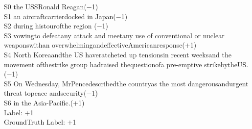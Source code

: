 \documentclass{article}
\begin{document}
\begin{tcolorbox}[colback=yellow!5!white,colframe=yellow!50!black,colbacktitle=yellow!75!black,title=Document 1,fonttitle=\bfseries]
\colorbox{green!14.285714285714285}{S0} \colorbox{red!75.0}{the} USS\colorbox{red!100.0}{Ronald} Reagan(\textsf{$-$1})\\
\colorbox{green!28.57142857142857}{S1} \colorbox{red!66.66666666666666}{an} aircraftcarrier\colorbox{red!83.33333333333334}{docked} \colorbox{red!100.0}{in} Japan(\textsf{$-$1})\\
\colorbox{green!42.857142857142854}{S2} \colorbox{red!66.66666666666666}{during} histourof\colorbox{red!83.33333333333334}{the} \colorbox{red!100.0}{region} (\textsf{$-$1})\\
\colorbox{green!57.14285714285714}{S3} vowing\colorbox{red!61.904761904761905}{to} defeat\colorbox{red!100.0}{any} \colorbox{red!76.19047619047619}{attack} \colorbox{red!90.47619047619048}{and} meet\colorbox{red!80.95238095238095}{any} \colorbox{red!66.66666666666666}{use} \colorbox{red!85.71428571428571}{of} \colorbox{red!71.42857142857143}{conventional} \colorbox{red!52.38095238095239}{or} \colorbox{red!57.14285714285714}{nuclear} weaponswith\colorbox{red!95.23809523809523}{an} overwhelmingandeffectiveAmericanresponse(\textsf{$+$1})\\
\colorbox{green!71.42857142857143}{S4} \colorbox{red!76.66666666666667}{North} Koreaand\colorbox{red!63.33333333333333}{the} \colorbox{red!73.33333333333333}{US} have\colorbox{red!86.66666666666667}{ratcheted} \colorbox{red!70.0}{up} tensions\colorbox{red!93.33333333333333}{in} \colorbox{red!53.333333333333336}{recent} weeks\colorbox{red!90.0}{and} \colorbox{red!56.666666666666664}{the} \colorbox{red!60.0}{movement} ofthe\colorbox{red!96.66666666666667}{strike} \colorbox{red!66.66666666666666}{group} had\colorbox{red!80.0}{raised} thequestionof\colorbox{red!100.0}{a} \colorbox{red!83.33333333333334}{pre-emptive} strikebytheUS.(\textsf{$-$1})\\
\colorbox{green!85.71428571428571}{S5} \colorbox{red!77.77777777777779}{On} \colorbox{red!83.33333333333334}{Wednesday,} MrPencedescribed\colorbox{red!88.88888888888889}{the} country\colorbox{red!94.44444444444444}{as} \colorbox{red!55.55555555555556}{the} \colorbox{red!66.66666666666666}{most} dangerousand\colorbox{red!61.111111111111114}{urgent} \colorbox{red!100.0}{threat} to\colorbox{red!72.22222222222221}{peace} andsecurity(\textsf{$-$1})\\
\colorbox{green!100.0}{S6} \colorbox{red!100.0}{in} \colorbox{red!66.66666666666666}{the} Asia-Pacific.(\textsf{$+$1})\\
\tcblowerPredict Label: \textsf{$+$1} \\GroundTruth Label: \textsf{$+$1}
\end{tcolorbox}
\end{document}
